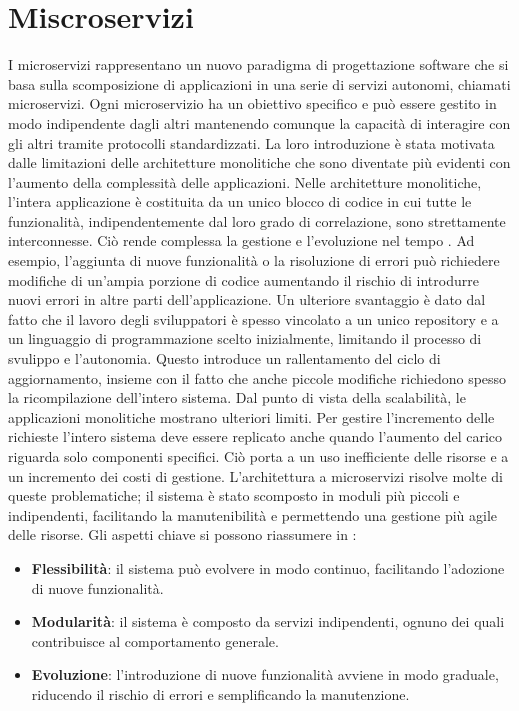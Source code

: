 \section{Miscroservizi}
I microservizi rappresentano un nuovo paradigma di progettazione software che si basa sulla scomposizione di applicazioni in una serie di servizi autonomi, chiamati microservizi.
Ogni microservizio ha un obiettivo specifico e può essere gestito in modo indipendente dagli altri mantenendo comunque la capacità di interagire con gli altri tramite protocolli standardizzati.
\newline La loro introduzione è stata motivata dalle limitazioni delle architetture monolitiche che sono diventate più evidenti con l'aumento della complessità delle applicazioni. 
Nelle architetture monolitiche, l'intera applicazione è costituita da un unico blocco di codice in cui tutte le funzionalità, indipendentemente dal loro grado di correlazione, sono strettamente interconnesse.
Ciò rende complessa la gestione e l'evoluzione nel tempo \cite{dragoni2017}. 
Ad esempio, l'aggiunta di nuove funzionalità o la risoluzione di errori può richiedere modifiche di
un'ampia porzione di codice aumentando il rischio di introdurre nuovi errori in altre parti dell'applicazione.
Un ulteriore svantaggio è dato dal fatto che il lavoro degli sviluppatori è spesso vincolato a un unico repository  
e a un linguaggio di programmazione scelto inizialmente, limitando il processo di svulippo e l'autonomia.
Questo introduce un rallentamento del ciclo di aggiornamento, insieme con il fatto che anche piccole modifiche richiedono spesso la ricompilazione dell'intero sistema.
\newline Dal punto di vista della scalabilità, le applicazioni monolitiche mostrano ulteriori limiti.
Per gestire l'incremento delle richieste l'intero sistema deve essere replicato anche quando l'aumento del carico riguarda solo componenti specifici.
Ciò porta a un uso inefficiente delle risorse e a un incremento dei costi di gestione.
\newline L'architettura a microservizi risolve molte di queste problematiche;
il sistema è stato scomposto in moduli più piccoli e indipendenti, facilitando la manutenibilità e permettendo una gestione più agile delle risorse.
\newline Gli aspetti chiave si possono riassumere in \cite{dragoni2017}:
\begin{itemize}
    \item \textbf{Flessibilità}: il sistema può evolvere in modo continuo, facilitando l'adozione di nuove funzionalità.
    \item \textbf{Modularità}: il sistema è composto da servizi indipendenti, ognuno dei quali contribuisce al comportamento generale.
    \item \textbf{Evoluzione}: l'introduzione di nuove funzionalità avviene in modo graduale, riducendo il rischio di errori e semplificando la manutenzione.
\end{itemize}
